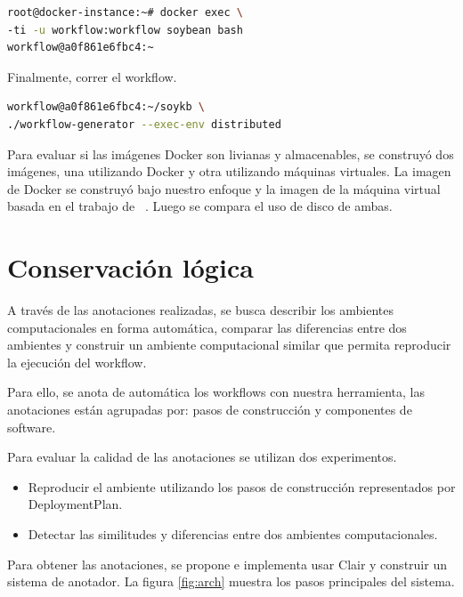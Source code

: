 \begin{lstlisting}[caption={Entrar al ambiente computacional utilizando bash},label={lst:2},language=bash]
root@docker-instance:~# docker exec \
-ti -u workflow:workflow soybean bash
workflow@a0f861e6fbc4:~ 
\end{lstlisting}

Finalmente, correr el workflow. 

\begin{lstlisting}[caption={Run the workflow},label={lst:3},language=bash]
workflow@a0f861e6fbc4:~/soykb \
./workflow-generator --exec-env distributed	
\end{lstlisting}

Para evaluar si las imágenes Docker son livianas y almacenables, se construyó dos imágenes, una utilizando Docker y otra utilizando máquinas virtuales. La imagen de Docker se construyó bajo nuestro enfoque y la imagen de la máquina virtual basada en el trabajo de ~\cite{santana2017reproducibility}. Luego se compara el uso de disco de ambas.

\section{Conservación lógica}\label{s5.3}

A través de las anotaciones realizadas, se busca describir los ambientes computacionales en forma automática, comparar las diferencias entre dos ambientes y construir un ambiente computacional similar que permita reproducir la ejecución del workflow. 

Para ello, se anota de automática los workflows con nuestra herramienta, las anotaciones están agrupadas por: pasos de construcción y componentes de software. 

Para evaluar la calidad de las anotaciones se utilizan dos experimentos.

\begin{itemize}
	\item Reproducir el ambiente utilizando los pasos de construcción representados por DeploymentPlan.
	\item Detectar las similitudes y diferencias entre dos ambientes computacionales.
\end{itemize}

Para obtener las anotaciones, se propone e implementa usar Clair y construir un sistema de anotador. La figura \ref{fig:arch} muestra los pasos principales del sistema.


